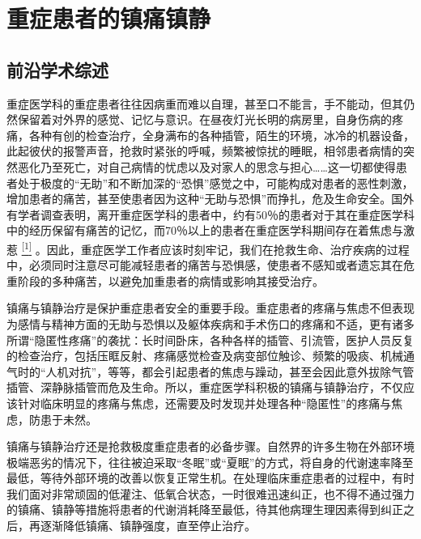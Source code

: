 \chapter{重症患者的镇痛镇静}

\section{前沿学术综述}

重症医学科的重症患者往往因病重而难以自理，甚至口不能言，手不能动，但其仍然保留着对外界的感觉、记忆与意识。在昼夜灯光长明的病房里，自身伤病的疼痛，各种有创的检查治疗，全身满布的各种插管，陌生的环境，冰冷的机器设备，此起彼伏的报警声音，抢救时紧张的呼喊，频繁被惊扰的睡眠，相邻患者病情的突然恶化乃至死亡，对自己病情的忧虑以及对家人的思念与担心\ldots{}\ldots{}这一切都使得患者处于极度的“无助”和不断加深的“恐惧”感觉之中，可能构成对患者的恶性刺激，增加患者的痛苦，甚至使患者因为这种“无助与恐惧”而挣扎，危及生命安全。国外有学者调查表明，离开重症医学科的患者中，约有50％的患者对于其在重症医学科中的经历保留有痛苦的记忆，而70％以上的患者在重症医学科期间存在着焦虑与激惹
\protect\hyperlink{text00027.htmlux5cux23ch1-26}{\textsuperscript{{[}1{]}}}
。因此，重症医学工作者应该时刻牢记，我们在抢救生命、治疗疾病的过程中，必须同时注意尽可能减轻患者的痛苦与恐惧感，使患者不感知或者遗忘其在危重阶段的多种痛苦，以避免加重患者的病情或影响其接受治疗。

镇痛与镇静治疗是保护重症患者安全的重要手段。重症患者的疼痛与焦虑不但表现为感情与精神方面的无助与恐惧以及躯体疾病和手术伤口的疼痛和不适，更有诸多所谓“隐匿性疼痛”的袭扰：长时间卧床，各种各样的插管、引流管，医护人员反复的检查治疗，包括压眶反射、疼痛感觉检查及病变部位触诊、频繁的吸痰、机械通气时的“人机对抗”，等等，都会引起患者的焦虑与躁动，甚至会因此意外拔除气管插管、深静脉插管而危及生命。所以，重症医学科积极的镇痛与镇静治疗，不仅应该针对临床明显的疼痛与焦虑，还需要及时发现并处理各种“隐匿性”的疼痛与焦虑，防患于未然。

镇痛与镇静治疗还是抢救极度重症患者的必备步骤。自然界的许多生物在外部环境极端恶劣的情况下，往往被迫采取“冬眠”或“夏眠”的方式，将自身的代谢速率降至最低，等待外部环境的改善以恢复正常生机。在处理临床重症患者的过程中，有时我们面对非常顽固的低灌注、低氧合状态，一时很难迅速纠正，也不得不通过强力的镇痛、镇静等措施将患者的代谢消耗降至最低，待其他病理生理因素得到纠正之后，再逐渐降低镇痛、镇静强度，直至停止治疗。

